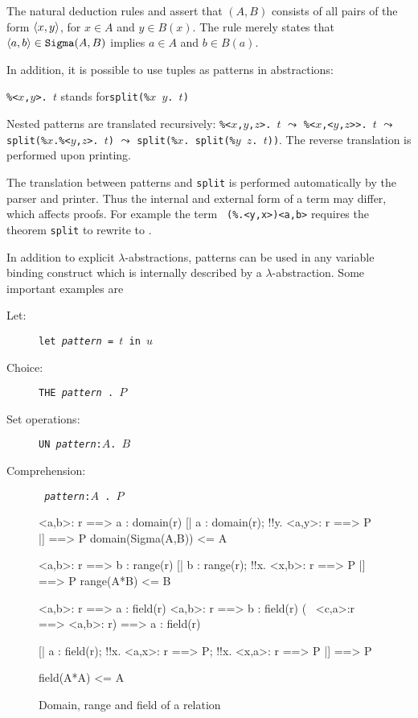 The natural deduction rules  and 
assert that $(A,B)$ consists of all pairs of the form
$\langle x,y\rangle$, for $x\in A$ and $y\in B(x)$.  The rule 
merely states that $\langle a,b\rangle\in \texttt{Sigma}(A,B)$ implies $a\in A$ and
$b\in B(a)$.

In addition, it is possible to use tuples as patterns in abstractions:
\begin{center}
{\tt\%<$x$,$y$>. $t$} \quad stands for\quad \texttt{split(\%$x$ $y$. $t$)}
\end{center}
Nested patterns are translated recursively:
{\tt\%<$x$,$y$,$z$>. $t$} $\leadsto$ {\tt\%<$x$,<$y$,$z$>>. $t$} $\leadsto$
\texttt{split(\%$x$.\%<$y$,$z$>. $t$)} $\leadsto$ \texttt{split(\%$x$. split(\%$y$
  $z$. $t$))}.  The reverse translation is performed upon printing.
\begin{warn}
  The translation between patterns and \texttt{split} is performed automatically
  by the parser and printer.  Thus the internal and external form of a term
  may differ, which affects proofs.  For example the term {\tt
    (\%<x,y>.<y,x>)<a,b>} requires the theorem \texttt{split} to rewrite to
  {\tt<b,a>}.
\end{warn}
In addition to explicit $\lambda$-abstractions, patterns can be used in any
variable binding construct which is internally described by a
$\lambda$-abstraction.  Some important examples are
\begin{description}
\item[Let:] \texttt{let {\it pattern} = $t$ in $u$}
\item[Choice:] \texttt{THE~{\it pattern}~.~$P$}
\item[Set operations:] \texttt{UN~{\it pattern}:$A$.~$B$}
\item[Comprehension:] \texttt{{\ttlbrace}~{\it pattern}:$A$~.~$P$~{\ttrbrace}}
\end{description}



\begin{figure}
\begin{ttbox}
        <a,b>: r ==> a : domain(r)
        [| a : domain(r);  !!y. <a,y>: r ==> P |] ==> P
  domain(Sigma(A,B)) <= A

         <a,b>: r ==> b : range(r)
         [| b : range(r);  !!x. <x,b>: r ==> P |] ==> P
   range(A*B) <= B

        <a,b>: r ==> a : field(r)
        <a,b>: r ==> b : field(r)
        (~ <c,a>:r ==> <a,b>: r) ==> a : field(r)

         [| a : field(r);  
                  !!x. <a,x>: r ==> P;  
                  !!x. <x,a>: r ==> P      
               |] ==> P

   field(A*A) <= A
\end{ttbox}
\caption{Domain, range and field of a relation} \label{zf-domrange}
\end{figure}

